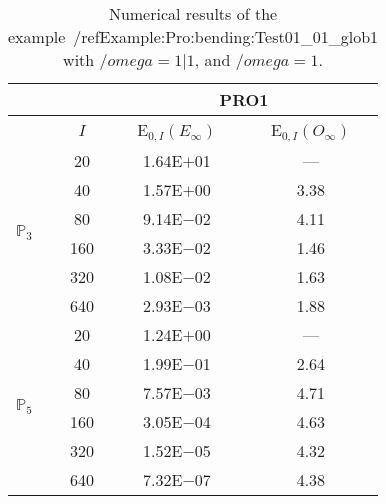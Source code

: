 \begin{table}[H]
\caption{Numerical results of the example~/ref{Example:Pro:bending:Test01_01_glob1} with $/omega=1|1$, and $/omega=1$.}
\setlength{\tabcolsep}{5pt}
\centering
\begin{tabular}{@{}l c c c@{}}
\toprule
 &  & \multicolumn{2}{c}{PRO1}\\
\midrule
 & $I$ & E$_{0,I}(E_{\infty})$ & E$_{0,I}(O_{\infty})$\\
\midrule
\multirow{6}{*}{$\mathbb{P}_{3}$}
 & 20 & 1.64E$+$01 & ---\\
 & 40 & 1.57E$+$00 & 3.38\\
 & 80 & 9.14E$-$02 & 4.11\\
 & 160 & 3.33E$-$02 & 1.46\\
 & 320 & 1.08E$-$02 & 1.63\\
 & 640 & 2.93E$-$03 & 1.88\\
\midrule
\multirow{6}{*}{$\mathbb{P}_{5}$}
 & 20 & 1.24E$+$00 & ---\\
 & 40 & 1.99E$-$01 & 2.64\\
 & 80 & 7.57E$-$03 & 4.71\\
 & 160 & 3.05E$-$04 & 4.63\\
 & 320 & 1.52E$-$05 & 4.32\\
 & 640 & 7.32E$-$07 & 4.38\\
\bottomrule
\end{tabular}
\label{Table:PRO:test_01_01_test24_pro1}
\end{table}
